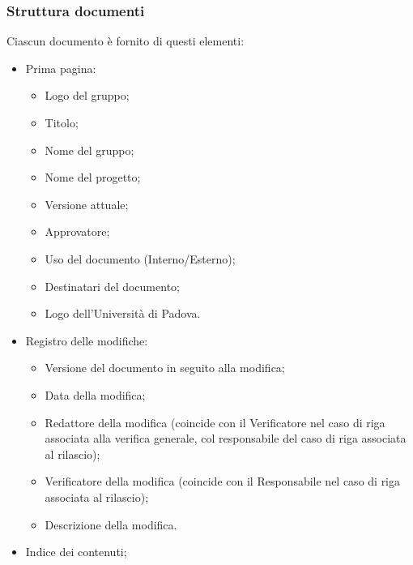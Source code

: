 \subsubsection{Struttura documenti}
Ciascun documento è fornito di questi elementi:
\begin{itemize}
  \item Prima pagina:
  \begin{itemize}
    \item Logo del gruppo;
    \item Titolo;
    \item Nome del gruppo;
    \item Nome del progetto;
    \item Versione attuale;
    \item Approvatore;
    \item Uso del documento (Interno/Esterno);
    \item Destinatari del documento;
    \item Logo dell'Università di Padova.
  \end{itemize}
  \item Registro delle modifiche:
  \begin{itemize}
    \item Versione del documento in seguito alla modifica;
    \item Data della modifica;
    \item Redattore della modifica (coincide con il Verificatore nel caso di riga associata alla verifica generale, col responsabile del caso di riga associata al rilascio);
    \item Verificatore della modifica (coincide con il Responsabile nel caso di riga associata al rilascio);
    \item Descrizione della modifica.
  \end{itemize}
  \item Indice dei contenuti;
\end{itemize}

